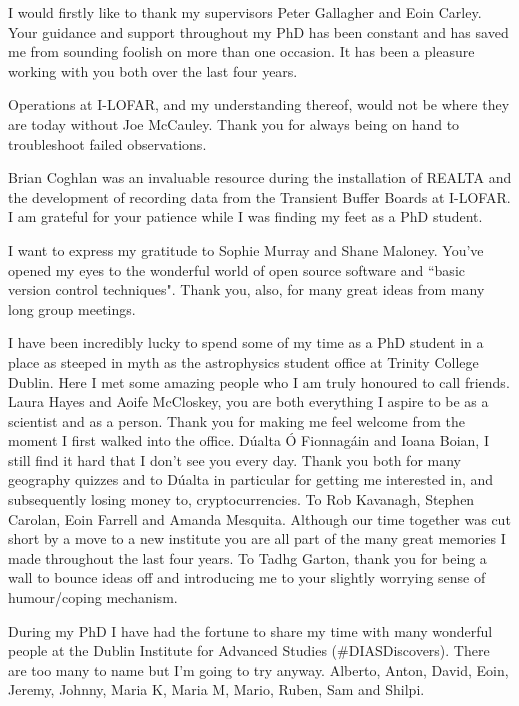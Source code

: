 \begin{acknowledgements}
I would firstly like to thank my supervisors Peter Gallagher and Eoin Carley. Your guidance and support throughout my PhD has been constant and has saved me from sounding foolish on more than one occasion. It has been a pleasure working with you both over the last four years.

Operations at I-LOFAR, and my understanding thereof, would not be where they are today without Joe McCauley. Thank you for always being on hand to troubleshoot failed observations.

Brian Coghlan was an invaluable resource during the installation of REALTA and the development of recording data from the Transient Buffer Boards at I-LOFAR. I am grateful for your patience while I was finding my feet as a PhD student. 

I want to express my gratitude to Sophie Murray and Shane Maloney. You've opened my eyes to the wonderful world of open source software and ``basic version control techniques". Thank you, also, for many great ideas from many long group meetings.

I have been incredibly lucky to spend some of my time as a PhD student in a place as steeped in myth as the astrophysics student office at Trinity College Dublin. Here I met some amazing people who I am truly honoured to call friends. Laura Hayes and Aoife McCloskey, you are both everything I aspire to be as a scientist and as a person. Thank you for making me feel welcome from the moment I first walked into the office.
D\'ualta \'O Fionnag\'ain and Ioana Boian, I still find it hard that I don't see you every day. Thank you both for many geography quizzes and to D\'ualta in particular for getting me interested in, and subsequently losing money to, cryptocurrencies.
To Rob Kavanagh, Stephen Carolan, Eoin Farrell and Amanda Mesquita. Although our time together was cut short by a move to a new institute you are all part of the many great memories I made throughout the last four years.
To Tadhg Garton, thank you for being a wall to bounce ideas off and introducing me to your slightly worrying sense of humour/coping mechanism.

During my PhD I have had the fortune to share my time with many wonderful people at the Dublin Institute for Advanced Studies (\#DIASDiscovers). There are too many to name but I'm going to try anyway. Alberto, Anton, David, Eoin, Jeremy, Johnny, Maria K, Maria M, Mario, Ruben, Sam and Shilpi.


\end{acknowledgements}
